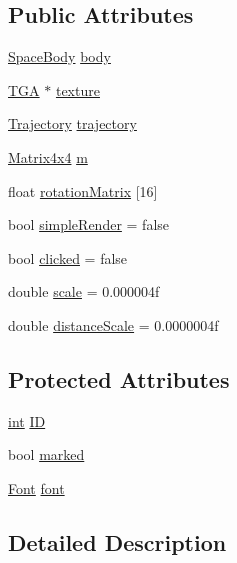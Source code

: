 \subsection*{Public Attributes}
\begin{DoxyCompactItemize}
\item 
\hyperlink{class_space_body}{Space\+Body} \hyperlink{class_planet_a31ab1654dd709417ec574489f3ff9449}{body}
\item 
\hyperlink{class_t_g_a}{T\+G\+A} $\ast$ \hyperlink{class_planet_abe80bd4546d0c412fdb14bd831e035df}{texture}
\item 
\hyperlink{class_trajectory}{Trajectory} \hyperlink{class_planet_aa5996da28b63251a27728cc07f233234}{trajectory}
\item 
\hyperlink{class_matrix4x4}{Matrix4x4} \hyperlink{class_planet_aba2872d5b503c1f36436bc7e05b27b51}{m}
\item 
float \hyperlink{class_planet_adc07c8cd520fd4dac2c646c30085c65b}{rotation\+Matrix} \mbox{[}16\mbox{]}
\item 
bool \hyperlink{class_planet_a0d455048a88b3c681a0f1480802445f8}{simple\+Render} = false
\item 
bool \hyperlink{class_planet_abeda08386455b0aae9f55b4623f89200}{clicked} = false
\item 
double \hyperlink{class_planet_a43314ec05b89111f6a3a1787cb9f8af3}{scale} = 0.\+000004f
\item 
double \hyperlink{class_planet_a233de9f5467dd01708a6ea14fadeb057}{distance\+Scale} = 0.\+0000004f
\end{DoxyCompactItemize}
\subsection*{Protected Attributes}
\begin{DoxyCompactItemize}
\item 
\hyperlink{wglext_8h_a500a82aecba06f4550f6849b8099ca21}{int} \hyperlink{class_planet_aa0ecbff60832f5532799b452fa45783d}{I\+D}
\item 
bool \hyperlink{class_planet_a0e7b5b758400af733e7a06380ff4cf84}{marked}
\item 
\hyperlink{class_font}{Font} \hyperlink{class_planet_a7a9f21f63faf830b6bbbbec3e0ac668c}{font}
\end{DoxyCompactItemize}


\subsection{Detailed Description}


